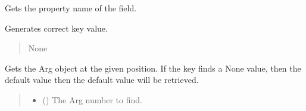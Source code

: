 \documentclass[letterpaper,10pt,english]{sphinxmanual}
\begin{document}
\begin{fulllineitems}
\begin{fulllineitems}
\label{\detokenize{apache_commons_validator_python:apache_commons_validator_python.field_new.Field.field_property}}
\pysigstartsignatures
{}
\pysigstopsignatures
\sphinxAtStartPar
Gets the property name of the field.

\end{fulllineitems}


\begin{fulllineitems}
\label{\detokenize{apache_commons_validator_python:apache_commons_validator_python.field_new.Field.generate_key}}
\pysigstartsignatures
{}
\pysigstopsignatures
\sphinxAtStartPar
Generates correct key value.
\begin{quote}\begin{description}
\sphinxAtStartPar
None

\end{description}\end{quote}

\end{fulllineitems}


\begin{fulllineitems}
\label{\detokenize{apache_commons_validator_python:apache_commons_validator_python.field_new.Field.get_arg}}
\pysigstartsignatures
{}
\pysigstopsignatures
\sphinxAtStartPar
Gets the Arg object at the given position. If the key finds a None value,
then the default value then the default value will be retrieved.
\begin{quote}\begin{description}
\begin{itemize}
\item {} 
\sphinxAtStartPar
{} () \textendash{} The Arg number to find.


\end{itemize}
\end{description}
\end{quote}
\end{fulllineitems}
\end{fulllineitems}
\end{document}
